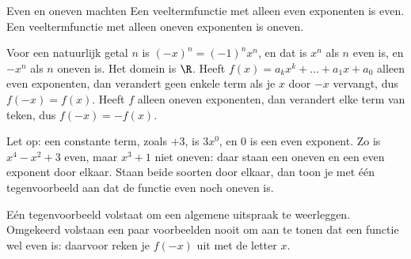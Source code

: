 \begin{theorie}
\begin{stelling}{Even en oneven machten}
Een veeltermfunctie met alleen even exponenten is even. Een veeltermfunctie met alleen oneven exponenten is oneven.
\end{stelling}

\begin{bewijs}
Voor een natuurlijk getal $n$ is $(-x)^n = (-1)^n x^n$, en dat is $x^n$ als $n$ even is, en $-x^n$ als $n$ oneven is. Het domein is $\R$. Heeft $f(x) = a_k x^k + \ldots + a_1 x + a_0$ alleen even exponenten, dan verandert geen enkele term als je $x$ door $-x$ vervangt, dus $f(-x) = f(x)$. Heeft $f$ alleen oneven exponenten, dan verandert elke term van teken, dus $f(-x) = -f(x)$.
\end{bewijs}
\end{theorie}

Let op: een constante term, zoals $+3$, is $3x^0$, en $0$ is een even exponent. Zo is $x^4 - x^2 + 3$ even, maar $x^3 + 1$ niet oneven: daar staan een oneven en een even exponent door elkaar. Staan beide soorten door elkaar, dan toon je met één tegenvoorbeeld aan dat de functie even noch oneven is.


Eén tegenvoorbeeld volstaat om een algemene uitspraak te weerleggen. Omgekeerd volstaan een paar voorbeelden nooit om aan te tonen dat een functie wel even is: daarvoor reken je $f(-x)$ uit met de letter $x$.

\begin{oefeningen}
\end{oefeningen}

\opdrachtenkop

